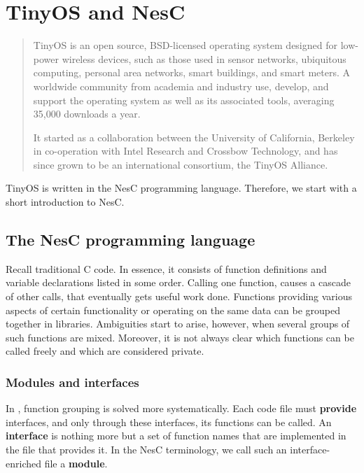 \chapter{TinyOS and NesC}
\label{ch:tos_and_nesc}

\begin{quotation}
TinyOS is an open source, BSD-licensed operating system designed for low-power wireless devices, such as those used in sensor networks, ubiquitous computing, personal area networks, smart buildings, and smart meters. A worldwide community from academia and industry use, develop, and support the operating system as well as its associated tools, averaging 35,000 downloads a year.

It started as a collaboration between the University of California, Berkeley in co-operation with Intel Research and Crossbow Technology, and has since grown to be an international consortium, the TinyOS Alliance.

{\hfill \cite{TOSnet,TOSw}}
\end{quotation}

TinyOS is written in the NesC programming language. Therefore, we start with a short introduction to NesC.

\section{The NesC programming language}

Recall traditional C code. In essence, it consists of function definitions and variable declarations listed in some order. Calling one function, causes a cascade of other calls, that eventually gets useful work done. Functions providing various aspects of certain functionality or operating on the same data can be grouped together in libraries. Ambiguities start to arise, however, when several groups of such functions are mixed. Moreover, it is not always clear which functions can be called freely and which are considered private.

\subsection{Modules and interfaces}

In \cite{NesC}, function grouping is solved more systematically. Each code file must {\bf provide} interfaces, and only through these interfaces, its functions can be called. An {\bf interface} is nothing more but a set of function names that are implemented in the file that provides it. In the NesC terminology, we call such an interface-enriched file a {\bf module}.

